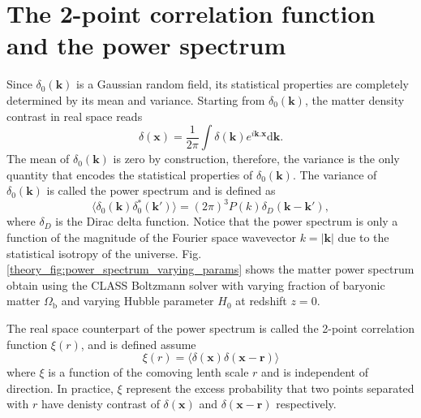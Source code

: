 \section{The 2-point correlation function and the power spectrum} \label{theory_sec:statistics}
Since $\delta_{0}(\mathbf{k})$ is a Gaussian random field, its statistical properties are completely determined by its mean and variance. Starting from $\delta_{0}(\mathbf{k})$, the matter density contrast in real space reads
\begin{equation} \label{eq:fourier}
    \delta(\mathbf{x}) = \frac{1}{2\pi}\int \delta(\mathbf{k}) e^{i\mathbf{k}.\mathbf{x}} \mathrm{d} \mathbf{k}.
\end{equation}
The mean of $\delta_{0}(\mathbf{k})$ is zero by construction, therefore, the variance is the only quantity that encodes the statistical properties of $\delta_{0}(\mathbf{k})$. The variance of $\delta_{0}(\mathbf{k})$ is called the power spectrum and is defined as
\begin{equation} \label{eq:power_spectrum}
    \langle \delta_{0}(\mathbf{k}) \delta_{0}^*(\mathbf{k}') \rangle = (2\pi)^3 P(k) \delta_D(\mathbf{k} - \mathbf{k}'),
\end{equation}
where $\delta_D$ is the Dirac delta function. Notice that the power spectrum is only a function of the magnitude of the Fourier space wavevector $k = |\mathbf{k}|$ due to the statistical isotropy of the universe. Fig. \ref{theory_fig:power_spectrum_varying_params} shows the matter power spectrum obtain using the CLASS Boltzmann solver \citep{lesgourgues2011cosmic} with varying fraction of baryonic matter $\Omega_{\mathrm{b}}$ and varying Hubble parameter $H_0$ at redshift $z = 0$.

The real space counterpart of the power spectrum is called the 2-point correlation function $\xi(r)$, and is defined assume
\begin{equation}
    \xi(r) = \langle \delta(\mathbf{x}) \delta(\mathbf{x} - \mathbf{r})\rangle
\end{equation}
where $\xi$ is a function of the comoving lenth scale $r$ and is independent of direction. In practice, $\xi$ represent the excess probability that two points separated with $r$ have denisty contrast of $\delta(\mathbf{x})$ and  $\delta(\mathbf{x} - \mathbf{r})$ respectively.

